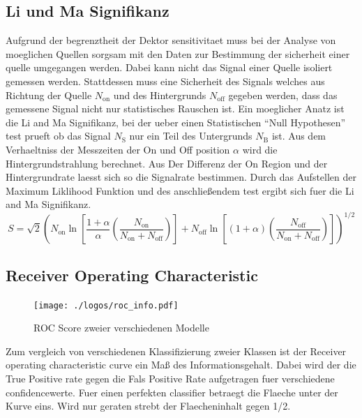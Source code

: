 \subsection{Li und Ma Signifikanz}
Aufgrund der begrenztheit der Dektor sensitivitaet muss bei der Analyse von moeglichen Quellen sorgsam mit den Daten zur Bestimmung der sicherheit einer quelle umgegangen werden. Dabei kann nicht das Signal einer Quelle isoliert gemessen werden. Stattdessen muss eine Sicherheit des Signals welches aus Richtung der Quelle $N_\text{on}$ und des Hintergrunds $N_\text{off}$ gegeben werden, dass das gemessene Signal nicht nur statistisches Rauschen ist. Ein moeglicher Anatz ist die Li and Ma Signifikanz, bei der ueber einen Statistischen ``Null Hypothesen'' test prueft ob das Signal $N_\text{S}$ nur ein Teil des Untergrunds $N_\text{B}$ ist. Aus dem Verhaeltniss der Messzeiten der On und Off position $\alpha$ wird die Hintergrundstrahlung berechnet. Aus Der Differenz der On Region und der Hintergrundrate laesst sich so die Signalrate bestimmen. Durch das Aufstellen der Maximum Liklihood Funktion und des anschließendem test ergibt sich fuer die Li and Ma Signifikanz.
\begin{equation}
S = \sqrt{2} \left( N_\text{on} \ln \left[ \frac{1+ \alpha}{\alpha}\left( \frac{N_\text{on}}{N_\text{on} + N_\text{off}} \right) \right] + N_\text{off} \ln \left[ \left( 1+ \alpha \right) \left( \frac{N_\text{off}}{N_\text{on} + N_\text{off}} \right) \right] \right)^{1/2}
\end{equation}

\subsection{Receiver Operating Characteristic}
\begin{figure}
  \centering
  \texttt{[image: ./logos/roc\_info.pdf]}
  \caption{ROC Score zweier verschiedenen Modelle}
\end{figure}
Zum vergleich von verschiedenen Klassifizierung zweier Klassen ist der Receiver operating characteristic curve ein Maß des Informationsgehalt. Dabei wird der die True Positive rate gegen die Fals Positive Rate aufgetragen fuer verschiedene confidencewerte. Fuer einen perfekten classifier betraegt die Flaeche unter der Kurve eins. Wird nur geraten strebt der Flaecheninhalt gegen 1/2.
